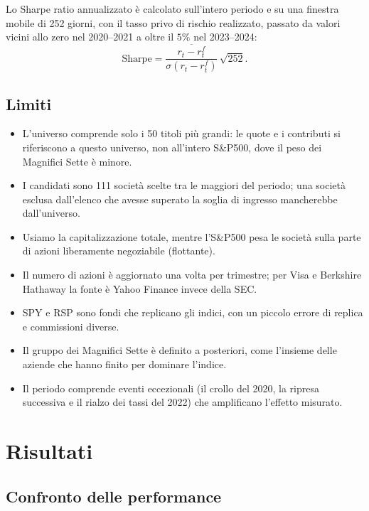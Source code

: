 \documentclass[12pt, a4paper]{article}
\begin{document}
Lo Sharpe ratio annualizzato \`e calcolato sull'intero periodo e su una finestra mobile di 252 giorni, con il tasso privo di rischio realizzato, passato da valori vicini allo zero nel 2020--2021 a oltre il $5\%$ nel 2023--2024:
\begin{equation}
  \mathrm{Sharpe} = \frac{\overline{r_t - r^{f}_t}}{\sigma(r_t - r^{f}_t)} \, \sqrt{252}.
\end{equation}

\subsection{Limiti}

\begin{itemize}
  \item L'universo comprende solo i 50 titoli pi\`u grandi: le quote e i contributi si riferiscono a questo universo, non all'intero S\&P500, dove il peso dei Magnifici Sette \`e minore.
  \item I candidati sono 111 societ\`a scelte tra le maggiori del periodo; una societ\`a esclusa dall'elenco che avesse superato la soglia di ingresso mancherebbe dall'universo.
  \item Usiamo la capitalizzazione totale, mentre l'S\&P500 pesa le societ\`a sulla parte di azioni liberamente negoziabile (flottante).
  \item Il numero di azioni \`e aggiornato una volta per trimestre; per Visa e Berkshire Hathaway la fonte \`e Yahoo Finance invece della SEC.
  \item SPY e RSP sono fondi che replicano gli indici, con un piccolo errore di replica e commissioni diverse.
  \item Il gruppo dei Magnifici Sette \`e definito a posteriori, come l'insieme delle aziende che hanno finito per dominare l'indice.
  \item Il periodo comprende eventi eccezionali (il crollo del 2020, la ripresa successiva e il rialzo dei tassi del 2022) che amplificano l'effetto misurato.
\end{itemize}

\section{Risultati}

\subsection{Confronto delle performance}
\end{document}
